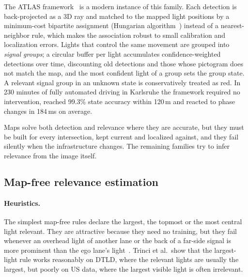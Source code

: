 The ATLAS framework~\cite{polley2025atlas} is a modern instance of this family. Each detection is
back-projected as a 3D ray and matched to the mapped light positions by a minimum-cost bipartite
assignment (Hungarian algorithm~\cite{kuhn1955hungarian}) instead of a nearest-neighbor rule, which
makes the association robust to small calibration and localization errors. Lights that control the
same movement are grouped into \emph{signal groups}; a circular buffer per light accumulates
confidence-weighted detections over time, discounting old detections and those whose pictogram does
not match the map, and the most confident light of a group sets the group state. A relevant signal
group in an unknown state is conservatively treated as red. In 230 minutes of fully automated driving
in Karlsruhe the framework required no intervention, reached 99.3\% state accuracy within 120\,m and
reacted to phase changes in 184\,ms on average.

Maps solve both detection and relevance where they are accurate, but they must be built for every
intersection, kept current and localized against, and they fail silently when the infrastructure
changes. The remaining families try to infer relevance from the image itself.

\subsection{Map-free relevance estimation}

\paragraph{Heuristics.} The simplest map-free rules declare the largest, the topmost or the most
central light relevant. They are attractive because they need no training, but they fail whenever an
overhead light of another lane or the back of a far-side signal is more prominent than the ego lane's
light~\cite{polley2025atlas,trinci2026color}. Trinci et al.\ show that the largest-light rule works
reasonably on DTLD, where the relevant lights are usually the largest, but poorly on US data, where the
largest visible light is often irrelevant.

